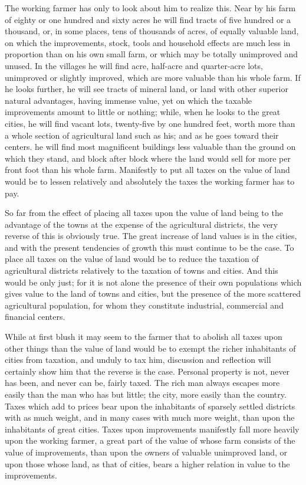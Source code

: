 \documentclass{book}
\begin{document}
The working farmer has only to look about him to realize this. Near by his farm of eighty or one hundred and sixty acres he will find tracts of five hundred or a thousand, or, in some places, tens of thousands of acres, of equally valuable land, on which the improvements, stock, tools and household effects are much less in proportion than on his own small farm, or which may be totally unimproved and unused. In the villages he will find acre, half-acre and quarter-acre lots, unimproved or slightly improved, which are more valuable than his whole farm. If he looks further, he will see tracts of mineral land, or land with other superior natural advantages, having immense value, yet on which the taxable improvements amount to little or nothing; while, when he looks to the great cities, he will find vacant lots, twenty-five by one hundred feet, worth more than a whole section of agricultural land such as his; and as he goes toward their centers. he will find most magnificent buildings less valuable than the ground on which they stand, and block after block where the land would sell for more per front foot than his whole farm. Manifestly to put all taxes on the value of land would be to lessen relatively and absolutely the taxes the working farmer has to pay.

So far from the effect of placing all taxes upon the value of land being to the advantage of the towns at the expense of the agricultural districts, the very reverse of this is obviously true. The great increase of land values is in the cities, and with the present tendencies of growth this must continue to be the case. To place all taxes on the value of land would be to reduce the taxation of agricultural districts relatively to the taxation of towns and cities. And this would be only just; for it is not alone the presence of their own populations which gives value to the land of towns and cities, but the presence of the more scattered agricultural population, for whom they constitute industrial, commercial and financial centers.

While at first blush it may seem to the farmer that to abolish all taxes upon other things than the value of land would be to exempt the richer inhabitants of cities from taxation, and unduly to tax him, discussion and reflection will certainly show him that the reverse is the case. Personal property is not, never has been, and never can be, fairly taxed. The rich man always escapes more easily than the man who has but little; the city, more easily than the country. Taxes which add to prices bear upon the inhabitants of sparsely settled districts with as much weight, and in many cases with much more weight, than upon the inhabitants of great cities. Taxes upon improvements manifestly fall more heavily upon the working farmer, a great part of the value of whose farm consists of the value of improvements, than upon the owners of valuable unimproved land, or upon those whose land, as that of cities, bears a higher relation in value to the improvements.
\end{document}
